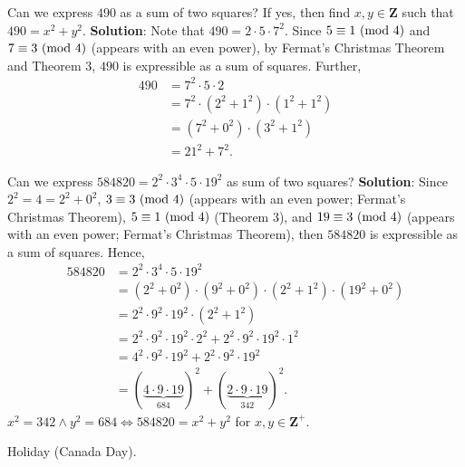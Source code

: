 \begin{Example}{}{}
    Can we express $ 490 $ as a sum of two squares? If yes, then find $ x,y\in\mathbf{Z} $ such that
    $ 490=x^2+y^2 $.
    \tcblower{}
    \textbf{Solution}:
    Note that $ 490=2\cdot 5\cdot 7^2 $. Since $ 5\equiv 1\ (\mathrm{mod}\ 4) $ and $ 7\equiv 3\ (\mathrm{mod}\ 4) $ (appears with an even power), by Fermat's Christmas Theorem
    and Theorem 3, $ 490 $ is expressible as a sum of squares. Further,
    \begin{align*}
        490 & =7^2\cdot 5\cdot 2                 \\
            & =7^2\cdot (2^2+1^2)\cdot (1^2+1^2) \\
            & =(7^2+0^2)\cdot (3^2+1^2)          \\
            & =21^2+7^2.
    \end{align*}
\end{Example}
\begin{Exercise}{}{}
    Can we express $ 584820=2^2\cdot 3^4\cdot 5\cdot 19^2 $ as sum of two squares?
    \tcblower{}
    \textbf{Solution}: Since $ 2^2=4=2^2+0^2 $, $ 3\equiv 3\ (\mathrm{mod}\ 4) $ (appears with an even power; Fermat's Christmas Theorem),
    $ 5\equiv 1\ (\mathrm{mod}\ 4) $ (Theorem 3), and $ 19\equiv 3\ (\mathrm{mod}\ 4) $ (appears with an even power; Fermat's Christmas Theorem),
    then $ 584820 $ is expressible as a sum of squares. Hence,
    \begin{align*}
        584820
         & =2^2\cdot 3^4\cdot 5\cdot 19^2                                                    \\
         & =(2^2+0^2)\cdot (9^2+0^2)\cdot (2^2+1^2)\cdot (19^2+0^2)                          \\
         & =2^2\cdot 9^2\cdot 19^2\cdot (2^2+1^2)                                            \\
         & =2^2\cdot 9^2\cdot 19^2\cdot 2^2+2^2\cdot 9^2\cdot 19^2\cdot 1^2                  \\
         & =4^2\cdot 9^2\cdot 19^2+2^2\cdot 9^2\cdot 19^2                                    \\
         & =(\underbrace{4\cdot 9\cdot 19}_{684})^2+(\underbrace{2\cdot 9\cdot 19}_{342})^2.
    \end{align*}
    $ x^2=342\land y^2=684 \iff 584820=x^2+y^2 $ for $ x,y\in\mathbf{Z}^+ $.
\end{Exercise}


Holiday (Canada Day).